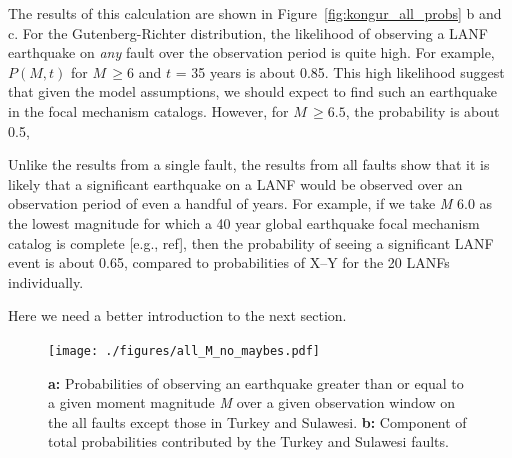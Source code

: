 \documentclass[twocolumn,grl]{AGUTeX}
\begin{document}
\begin{article}
The results of this calculation are shown in
Figure~\ref{fig:kongur_all_probs} b and c.
For the Gutenberg-Richter distribution, the likelihood of observing a LANF
earthquake on \emph{any} fault over the observation period is quite high.
For example, $P(M,t)$ for $M \, \ge 6$ and $t$ = 35 years is about 0.85.
This high likelihood suggest that given the model assumptions, we should
expect to find such an earthquake in the focal mechanism catalogs.
However, for $M \, \ge 6.5$, the probability is about 0.5,


Unlike the results from a single
fault, the results from all faults show that it is likely that a
significant earthquake on a LANF would be observed over an observation
period of even a handful of years.  For example, if we take \emph{M}
6.0 as the lowest magnitude for which a 40 year global earthquake
focal mechanism catalog is complete [e.g., ref], then the probability
of seeing a significant LANF event is about 0.65, compared to
probabilities of X--Y for the 20 LANFs individually.

Here we need a better introduction to the next section.

%



\begin{figure}%
\noindent\texttt{[image: ./figures/all\_M\_no\_maybes.pdf]}
\caption{\textbf{a:} Probabilities of observing an earthquake greater than or equal to a given moment magnitude \emph{M} over a given observation window on the all faults except those in Turkey and Sulawesi. \textbf{b:} Component of total probabilities contributed by the Turkey and Sulawesi faults.}
\label{fig:all_probs_no_maybes}
\end{figure}



\end{article}
\end{document}
